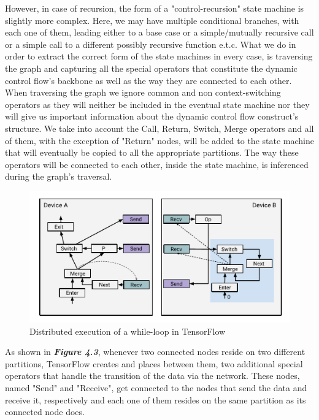 \documentclass[ack,preface]{dithesis}
\begin{document}
However, in case of recursion, the form of a "control-recursion" state machine is slightly more complex. Here, we may have multiple conditional branches, with each one of them, leading either to a base case or a simple/mutually recursive call or a simple call to a different possibly recursive function e.t.c. What we do in order to extract the correct form of the state machines in every case, is traversing the graph and capturing all the special operators that constitute the dynamic control flow's backbone as well as the way they are connected to each other. When traversing the graph we ignore common and non context-switching operators as they will neither be included in the eventual state machine nor they will give us important information about the dynamic control flow construct's structure. We take into account the Call, Return, Switch, Merge operators and all of them, with the exception of "Return" nodes, will be added to the state machine that will eventually  be copied to all the appropriate partitions. The way these operators will be connected to each other, inside the state machine, is inferenced during the graph's traversal.

\begin{figure}
\centering
\includegraphics[scale=1.2]{figures/sm_iteration}
\caption{Distributed execution of a while-loop in TensorFlow}
\end{figure}



As shown in \textit{\textbf{Figure 4.3}}, whenever two connected nodes  reside on two different partitions, TensorFlow creates and places between them, two additional special operators that handle the transition of the data via the network. These nodes, named "Send"  and "Receive", get connected to the nodes that send the data and receive it, respectively and each one of them resides on the same partition as its connected node does. 
\end{document}
